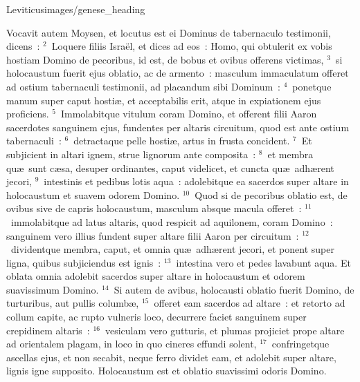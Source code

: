{Leviticus}{images/genese_heading}


\lettrine[lines=10,image=true,loversize=0.05,lraise=-0.03]{V}{}ocavit autem Moysen, et locutus est ei Dominus de tabernaculo testimonii, dicens~:
${}^{2}$~Loquere filiis Isra\"el, et dices ad eos~: Homo, qui obtulerit ex vobis hostiam Domino de pecoribus, id est, de bobus et ovibus offerens victimas,
${}^{3}$~si holocaustum fuerit ejus oblatio, ac de armento~: masculum immaculatum offeret ad ostium tabernaculi testimonii, ad placandum sibi Dominum~:
${}^{4}$~ponetque manum super caput hosti\ae , et acceptabilis erit, atque in expiationem ejus proficiens.
${}^{5}$~Immolabitque vitulum coram Domino, et offerent filii Aaron sacerdotes sanguinem ejus, fundentes per altaris circuitum, quod est ante ostium tabernaculi~:
${}^{6}$~detractaque pelle hosti\ae , artus in frusta concident.
${}^{7}$~Et subjicient in altari ignem, strue lignorum ante composita~:
${}^{8}$~et membra qu\ae\ sunt c\ae sa, desuper ordinantes, caput videlicet, et cuncta qu\ae\ adh\ae rent jecori,
${}^{9}$~intestinis et pedibus lotis aqua~: adolebitque ea sacerdos super altare in holocaustum et suavem odorem Domino.
${}^{10}$~Quod si de pecoribus oblatio est, de ovibus sive de capris holocaustum, masculum absque macula offeret~:
${}^{11}$~immolabitque ad latus altaris, quod respicit ad aquilonem, coram Domino~: sanguinem vero illius fundent super altare filii Aaron per circuitum~:
${}^{12}$~dividentque membra, caput, et omnia qu\ae\ adh\ae rent jecori, et ponent super ligna, quibus subjiciendus est ignis~:
${}^{13}$~intestina vero et pedes lavabunt aqua. Et oblata omnia adolebit sacerdos super altare in holocaustum et odorem suavissimum Domino.
${}^{14}$~Si autem de avibus, holocausti oblatio fuerit Domino, de turturibus, aut pullis columb\ae ,
${}^{15}$~offeret eam sacerdos ad altare~: et retorto ad collum capite, ac rupto vulneris loco, decurrere faciet sanguinem super crepidinem altaris~:
${}^{16}$~vesiculam vero gutturis, et plumas projiciet prope altare ad orientalem plagam, in loco in quo cineres effundi solent,
${}^{17}$~confringetque ascellas ejus, et non secabit, neque ferro dividet eam, et adolebit super altare, lignis igne supposito. Holocaustum est et oblatio suavissimi odoris Domino.

